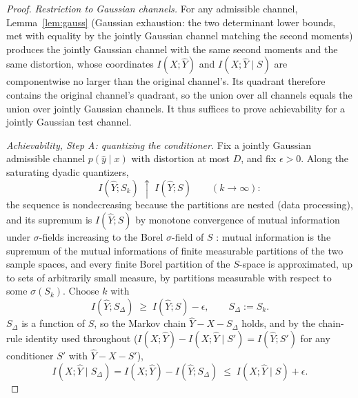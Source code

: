 ﻿\documentclass[11pt,onecolumn]{IEEEtran}
\newcommand{\hY}{\widehat{Y}}
\begin{document}
\begin{proof}
\emph{Restriction to Gaussian channels.} For any admissible channel,
Lemma~\ref{lem:gauss} (Gaussian exhaustion: the two determinant lower
bounds, met with equality by the jointly Gaussian channel matching the
second moments) produces the jointly Gaussian channel with the
same second moments and the same distortion, whose coordinates
$I(X;\hY)$ and $I(X;\hY\mid S)$ are componentwise no larger than the
original channel's. Its quadrant therefore
contains the original channel's quadrant, so the union over all
channels equals the union over jointly Gaussian channels. It thus
suffices to prove achievability for a jointly Gaussian test channel.

\emph{Achievability, Step A: quantizing the conditioner.} Fix a jointly
Gaussian admissible channel $p(\hat y\mid x)$ with distortion at most
$D$, and fix $\epsilon>0$. Along the saturating dyadic quantizers,
\begin{equation}
I(\hY;S_k)\;\uparrow\;I(\hY;S)\qquad(k\to\infty):
\label{eq:quant-mono}
\end{equation}
the sequence is nondecreasing because the partitions are nested (data
processing), and its supremum is $I(\hY;S)$ by monotone convergence of
mutual information under $\sigma$-fields increasing to the Borel
$\sigma$-field of $S$ \cite[Ch.~2]{pinsker1964}: mutual information is
the supremum of the mutual informations of finite measurable
partitions of the two sample spaces, and every finite Borel partition
of the $S$-space is approximated, up to sets of arbitrarily small
measure, by partitions measurable with respect to some
$\sigma(S_k)$. Choose $k$ with
\begin{equation}
I(\hY;S_\Delta)\;\ge\;I(\hY;S)-\epsilon,
\qquad S_\Delta:=S_k .
\label{eq:quant-approx}
\end{equation}
$S_\Delta$ is a function of $S$, so the Markov chain $\hY-X-S_\Delta$
holds, and by the chain-rule identity used throughout
($I(X;\hY)-I(X;\hY\mid S')=I(\hY;S')$ for any conditioner $S'$ with
$\hY-X-S'$),
\begin{equation}
I(X;\hY\mid S_\Delta)=I(X;\hY)-I(\hY;S_\Delta)
\;\le\;I(X;\hY\mid S)+\epsilon .
\label{eq:quant-chain}
\end{equation}


\end{proof}
\end{document}
